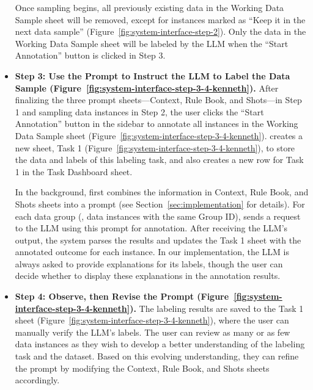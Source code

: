 \begin{itemize}
\begin{itemize}
\end{itemize}

Once sampling begins, all previously existing data in the Working Data Sample sheet will be removed, except for instances marked as ``Keep it in the next data sample'' (Figure~\ref{fig:system-interface-step-2}). 
Only the data in the Working Data Sample sheet will be labeled by the LLM when the ``Start Annotation'' button is clicked in Step 3.

\item 
\textbf{Step 3: Use the Prompt to Instruct the LLM to Label the Data Sample (Figure~\ref{fig:system-interface-step-3-4-kenneth}).}
After finalizing the three prompt sheets---Context, Rule Book, and Shots---in Step 1 and sampling data instances in Step 2, the user clicks the ``Start Annotation'' button in the sidebar to annotate all instances in the Working Data Sample sheet (Figure~\ref{fig:system-interface-step-3-4-kenneth}).
\system creates a new sheet, Task 1 (Figure~\ref{fig:system-interface-step-3-4-kenneth}), to store the data and labels of this labeling task, and also creates a new row for Task 1 in the Task Dashboard sheet.

In the background, \system first combines the information in Context, Rule Book, and Shots sheets into a prompt (see Section~\ref{sec:implementation} for details).
For each data group (\ie, data instances with the same Group ID), \system sends a request to the LLM using this prompt for annotation.
After receiving the LLM's output, the system parses the results and updates the Task 1 sheet with the annotated outcome for each instance. 
In our implementation, the LLM is always asked to provide explanations for its labels, though the user can decide whether to display these explanations in the annotation results.




\item 
\textbf{Step 4: Observe, then Revise the Prompt (Figure~\ref{fig:system-interface-step-3-4-kenneth}).}
The labeling results are saved to the Task 1 sheet (Figure~\ref{fig:system-interface-step-3-4-kenneth}), where the user can manually verify the LLM's labels.
The user can review as many or as few data instances as they wish to develop a better understanding of the labeling task and the dataset. 
Based on this evolving understanding, they can refine the prompt by modifying the Context, Rule Book, and Shots sheets accordingly.


\end{itemize}
